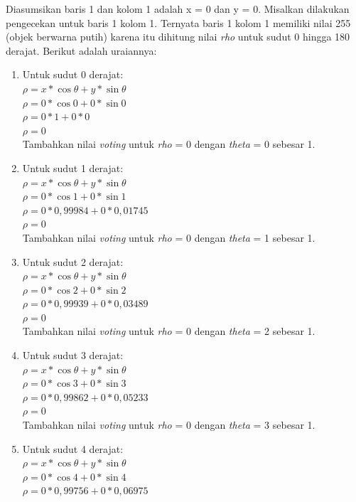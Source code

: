 \noindent Diasumsikan baris 1 dan kolom 1 adalah x = 0 dan y = 0. Misalkan dilakukan pengecekan untuk baris 1 kolom 1. Ternyata baris 1 kolom 1 memiliki nilai 255 (objek berwarna putih) karena itu dihitung nilai \textit{rho} untuk sudut 0 hingga 180 derajat. Berikut adalah uraiannya:
\begin{enumerate}
\item Untuk sudut 0 derajat:\\
$\rho = x * \cos{\theta} + y * \sin{\theta}$\\
$\rho = 0 * \cos{0} + 0 * \sin{0}$\\
$\rho = 0 * 1 + 0 * 0$\\
$\rho = 0$\\
Tambahkan nilai \textit{voting} untuk \textit{rho} = 0 dengan \textit{theta} = 0 sebesar 1.
\item Untuk sudut 1 derajat:\\
$\rho = x * \cos{\theta} + y * \sin{\theta}$\\
$\rho = 0 * \cos{1} + 0 * \sin{1}$\\
$\rho = 0 * 0,99984 + 0 * 0,01745$\\
$\rho = 0$\\
Tambahkan nilai \textit{voting} untuk \textit{rho} = 0 dengan \textit{theta} = 1 sebesar 1.
\item Untuk sudut 2 derajat:\\
$\rho = x * \cos{\theta} + y * \sin{\theta}$\\
$\rho = 0 * \cos{2} + 0 * \sin{2}$\\
$\rho = 0 * 0,99939 + 0 * 0,03489$\\
$\rho = 0$\\
Tambahkan nilai \textit{voting} untuk \textit{rho} = 0 dengan \textit{theta} = 2 sebesar 1.
\item Untuk sudut 3 derajat:\\
$\rho = x * \cos{\theta} + y * \sin{\theta}$\\
$\rho = 0 * \cos{3} + 0 * \sin{3}$\\
$\rho = 0 * 0,99862 + 0 * 0,05233$\\
$\rho = 0$\\
Tambahkan nilai \textit{voting} untuk \textit{rho} = 0 dengan \textit{theta} = 3 sebesar 1.
\item Untuk sudut 4 derajat:\\
$\rho = x * \cos{\theta} + y * \sin{\theta}$\\
$\rho = 0 * \cos{4} + 0 * \sin{4}$\\
$\rho = 0 * 0,99756 + 0 * 0,06975$\\

\end{enumerate}
